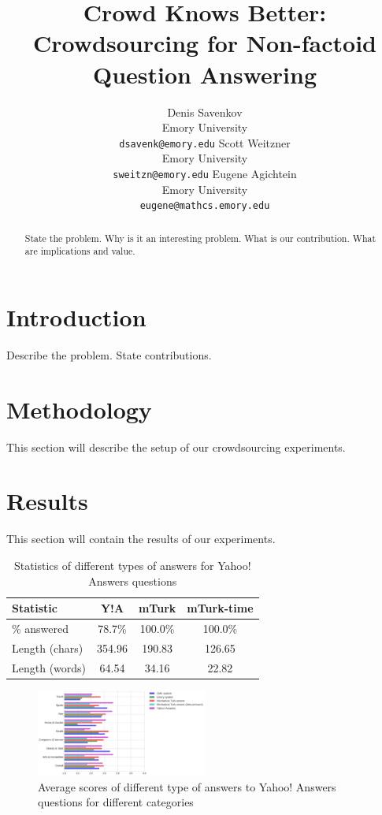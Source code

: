 \documentclass[11pt,letterpaper]{article}
\title{Crowd Knows Better: Crowdsourcing for Non-factoid Question Answering}
\author{Denis Savenkov \\ Emory University \\ {\tt dsavenk@emory.edu} 
  \And Scott Weitzner \\ Emory University \\ {\tt sweitzn@emory.edu}
  \And Eugene Agichtein \\ Emory University \\ {\tt eugene@mathcs.emory.edu}
}
\date{}
\begin{document}
\maketitle

\begin{abstract}
State the problem.
Why is it an interesting problem.
What is our contribution.
What are implications and value.
\end{abstract}

\section{Introduction}
\label{sec:introduction}

Describe the problem.
State contributions.

\section{Methodology}
\label{sec:methodology}

This section will describe the setup of our crowdsourcing experiments.

\section{Results}
\label{sec:results}

This section will contain the results of our experiments.

\begin{table}[h]
\centering
\caption{Statistics of different types of answers for Yahoo! Answers questions}
\begin{tabular}{| p{2.3cm} | c | c | c |}
\hline
Statistic & Y!A & mTurk & mTurk-time\\
\hline
\% answered & 78.7\% & 100.0\% & 100.0\% \\
Length (chars) & 354.96 & 190.83 & 126.65 \\
Length (words) & 64.54 & 34.16 & 22.82 \\
\hline
\end{tabular}
\label{table:answer_stats}
\end{table}

\begin{figure}[h]
\centering
\includegraphics[width=0.5\textwidth]{img/average_score}
\caption{Average scores of different type of answers to Yahoo! Answers questions for different categories}
\label{fig:average_score}
\end{figure}
\end{document}
